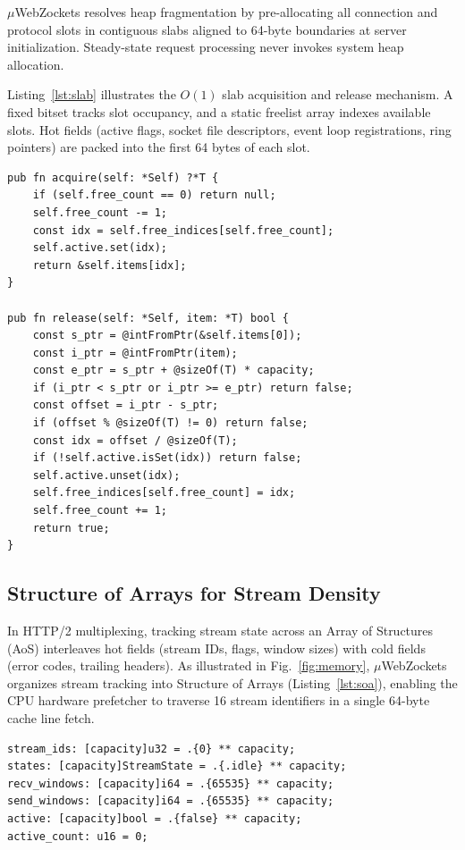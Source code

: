 \documentclass[journal]{IEEEtran}
\begin{document}
\ensuremath{\mu}WebZockets resolves heap fragmentation by pre-allocating all connection and protocol slots in contiguous slabs aligned to 64-byte boundaries at server initialization. Steady-state request processing never invokes system heap allocation.

Listing~\ref{lst:slab} illustrates the $O(1)$ slab acquisition and release mechanism. A fixed bitset tracks slot occupancy, and a static freelist array indexes available slots. Hot fields (active flags, socket file descriptors, event loop registrations, ring pointers) are packed into the first 64 bytes of each slot.

\begin{lstlisting}[language=Zig,caption={$O(1)$ Bitset and Freelist Slab Manager in \ensuremath{\mu}WebZockets},label={lst:slab}]
pub fn acquire(self: *Self) ?*T {
    if (self.free_count == 0) return null;
    self.free_count -= 1;
    const idx = self.free_indices[self.free_count];
    self.active.set(idx);
    return &self.items[idx];
}

pub fn release(self: *Self, item: *T) bool {
    const s_ptr = @intFromPtr(&self.items[0]);
    const i_ptr = @intFromPtr(item);
    const e_ptr = s_ptr + @sizeOf(T) * capacity;
    if (i_ptr < s_ptr or i_ptr >= e_ptr) return false;
    const offset = i_ptr - s_ptr;
    if (offset % @sizeOf(T) != 0) return false;
    const idx = offset / @sizeOf(T);
    if (!self.active.isSet(idx)) return false;
    self.active.unset(idx);
    self.free_indices[self.free_count] = idx;
    self.free_count += 1;
    return true;
}
\end{lstlisting}

\subsection{Structure of Arrays for Stream Density}

In HTTP/2 multiplexing, tracking stream state across an Array of Structures (AoS) interleaves hot fields (stream IDs, flags, window sizes) with cold fields (error codes, trailing headers). As illustrated in Fig.~\ref{fig:memory}, \ensuremath{\mu}WebZockets organizes stream tracking into Structure of Arrays (Listing~\ref{lst:soa}), enabling the CPU hardware prefetcher to traverse 16 stream identifiers in a single 64-byte cache line fetch.

\begin{lstlisting}[language=Zig,caption={Structure of Arrays layout for HTTP/2 streams},label={lst:soa}]
stream_ids: [capacity]u32 = .{0} ** capacity;
states: [capacity]StreamState = .{.idle} ** capacity;
recv_windows: [capacity]i64 = .{65535} ** capacity;
send_windows: [capacity]i64 = .{65535} ** capacity;
active: [capacity]bool = .{false} ** capacity;
active_count: u16 = 0;
\end{lstlisting}
\end{document}

